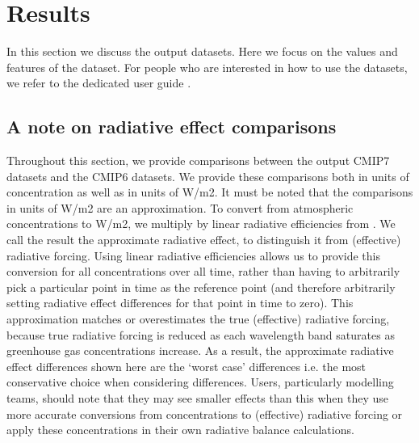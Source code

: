 \section{Results}
\label{sec:results}

%

In this section we discuss the output datasets.
Here we focus on the values and features of the dataset.
For people who are interested in how to use the datasets,
we refer to the dedicated user guide \citep{nicholls_historical-user-guide_2026}.

\subsection{A note on radiative effect comparisons}
\label{ssec:results-radiative-forcing-comparisons-note}

Throughout this section, we provide comparisons between the output CMIP7 datasets and the CMIP6 datasets.
We provide these comparisons both in units of concentration as well as in units of W/m2.
It must be noted that the comparisons in units of W/m2 are an approximation.
To convert from atmospheric concentrations to W/m2,
we multiply by linear radiative efficiencies from \citet{IPCC_AR6-WG1-Ch-7-SM_2021}.
We call the result the approximate radiative effect,
to distinguish it from (effective) radiative forcing.
Using linear radiative efficiencies allows us to provide this conversion for all concentrations over all time,
rather than having to arbitrarily pick a particular point in time as the reference point
(and therefore arbitrarily setting radiative effect differences for that point in time to zero).
This approximation matches or overestimates the true (effective) radiative forcing,
because true radiative forcing is reduced as each wavelength band saturates as greenhouse gas concentrations increase.
As a result, the approximate radiative effect differences shown here are the `worst case' differences
i.e. the most conservative choice when considering differences.
Users, particularly modelling teams, should note that they may see smaller effects than this
when they use more accurate conversions from concentrations to (effective) radiative forcing
or apply these concentrations in their own radiative balance calculations.

